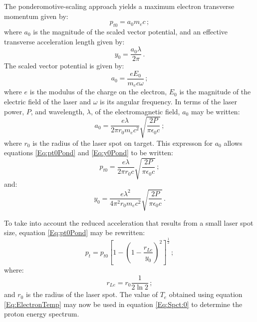 The ponderomotive-scaling approach yields a maximum electron
transverse momentum given by:
\begin{equation}
  p_{t0} = a_0 m_e c \, ;
  \label{Eq:pt0Pond}
\end{equation}
where $a_0$ is the magnitude of the scaled vector potential, and an
effective transverse acceleration length given by:
\begin{equation}
  y_0 = \frac{a_0 \lambda}{2\pi} \, .
  \label{Eq:y0Pond}
\end{equation}
The scaled vector potential is given by:
\begin{equation}
  a_0 = \frac{e E_0}{m_e c \omega} \, ;
\end{equation}
where $e$ is the modulus of the charge on the electron, $E_0$ is the
magnitude of the electric field of the laser and $\omega$ is its 
angular frequency.
In terms of the laser power, $P$, and wavelength, $\lambda$, of the
electromagnetic field, $a_0$ may be written:
\begin{equation}
  a_0 = \frac{e \lambda}{2\pi r_0 m_e c^2}
           \sqrt{\frac{2 P}{\pi \epsilon_0 c}} \, ;
\end{equation}
where $r_0$ is the radius of the laser spot on target.
This expresson for $a_0$ allows equations \ref{Eq:pt0Pond}
and \ref{Eq:y0Pond} to be written:
\begin{equation}
  p_{t0} = \frac{e \lambda}{2\pi r_0 c} 
           \sqrt{\frac{2 P}{\pi \epsilon_0 c}} \, ;
  \label{Eq:pt0Pond1}
\end{equation}
and:
\begin{equation}
  y_0 = \frac{e \lambda^2}{4\pi^2 r_0 m_e c^2} 
           \sqrt{\frac{2 P}{\pi \epsilon_0 c}} \, .
  \label{Eq:y0Pond1}
\end{equation}

To take into account the reduced acceleration that results from a
small laser spot size, equation \ref{Eq:pt0Pond} may be rewritten:
\begin{equation}
  p_t = p_{t0} \left[
                1 - \left(
                      1 - \frac{r_{Le}}{y_0}
                    \right)^2
              \right]^\frac{1}{2} \, ;
\end{equation}
where:
\begin{equation}
  r_{Le} = r_0 \frac{1}{2 \ln 2} \, ;
\end{equation}
and $r_0$ is the radius of the laser spot.
The value of $T_e$ obtained using equation \ref{Eq:ElectronTemp} may
now be used in equation \ref{Eq:Spct:0} to determine the proton energy
spectrum.

